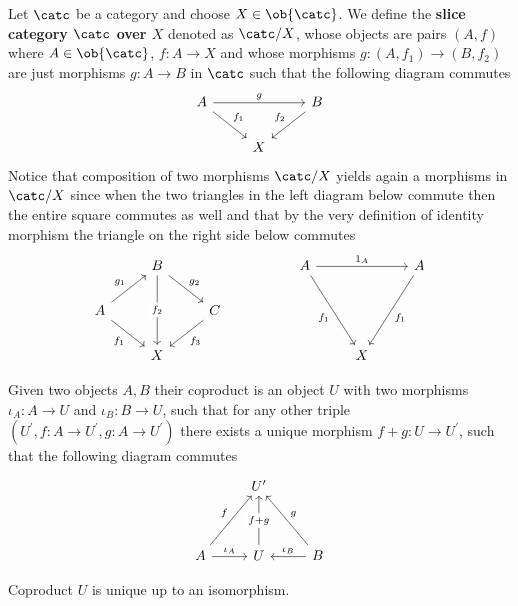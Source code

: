 \begin{definition}
    Let $\catc$ be a category and choose $X\in\ob{\catc}$. We define the \textbf{slice category $\catc$ over $X$} denoted as $\catc /X$,
    whose objects are pairs $(A,f)$ where $A\in\ob{\catc}$, $f: A \to X$ and whose morphisms 
    $g: (A,f_1) \to (B,f_2)$ are just morphisms $g:A\to B$ in $\catc$ such that the following diagram commutes
\[\begin{tikzcd}
	A && B \\
	& X
	\arrow["g", from=1-1, to=1-3]
	\arrow["{f_1}", from=1-1, to=2-2]
	\arrow["{f_2}"', from=1-3, to=2-2]
\end{tikzcd}\]
    Notice that composition of two morphisms $\catc /X$ yields again a morphisms in $\catc /X$
    since when the two triangles in the left diagram below commute then the entire square commutes as well
    and that by the very definition of identity morphism the triangle on the right side below commutes 
\[\begin{tikzcd}
	& B &&& A && A \\
	A && C \\
	& X &&&& X
	\arrow["{g_2}", from=1-2, to=2-3]
	\arrow["{f_2}"{description}, from=1-2, to=3-2]
	\arrow["{1_A}", from=1-5, to=1-7]
	\arrow["{f_1}"', from=1-5, to=3-6]
	\arrow["{f_1}", from=1-7, to=3-6]
	\arrow["{g_1}", from=2-1, to=1-2]
	\arrow["{f_1}"', from=2-1, to=3-2]
	\arrow["{f_3}", from=2-3, to=3-2]
\end{tikzcd}\]
\end{definition}
\begin{definition}
    Given two objects $A,B$ their coproduct is an object $U$ with 
    two morphisms $\iota_A: A \to U$ and $\iota_B: B \to U$, such
    that for any other triple $(U^\prime,f: A\to U^\prime,g: A\to U^\prime)$
    there exists a unique morphism $f+g: U\to U^\prime$, such that the following diagram commutes
\[\begin{tikzcd}
	& {U^\prime} \\
	\\
	A & U & B
	\arrow["f", from=3-1, to=1-2]
	\arrow["{\iota_A}", from=3-1, to=3-2]
	\arrow["{f+g}"{description}, from=3-2, to=1-2]
	\arrow["g"', from=3-3, to=1-2]
	\arrow["{\iota_B}"', from=3-3, to=3-2]
\end{tikzcd}\]
\end{definition}
\begin{proposition}
    Coproduct $U$ is unique up to an isomorphism.
\end{proposition}